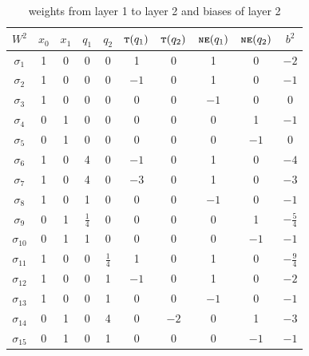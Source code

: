 \documentclass{beamer}
\newcommand{\shortTos}{\textsc{\texttt{t}}}
\newcommand{\shortNonempty}{\textsc{\texttt{ne}}}
\begin{document}
\begin{frame}
	\footnotesize
	\begin{table}
		\centering
		\begin{tabular}{|c| c c c c c c c c |c|}
			\hline 
			$W^2$ & $x_0$ & $x_1$ & $q_1$ & $q_2$ & $\shortTos(q_1)$ & $\shortTos(q_2)$ & $\shortNonempty(q_1)$ & $\shortNonempty(q_2)$ & $b^2$\\
			\hline
			$\sigma_1$ & 1 & 0 & 0 & 0 & 1 & 0 & 1 & 0 & $-2$\\
			$\sigma_2$ & 1 & 0 & 0 & 0 & $-1$ & 0 & 1 & 0 & $-1$\\
			$\sigma_3$ & 1 & 0 & 0 & 0 & 0 & 0 & $-1$ & 0 & 0\\
			$\sigma_4$ & 0 & 1 & 0 & 0 & 0 & 0 & 0 & 1 & $-1$\\
			$\sigma_5$ & 0 & 1 & 0 & 0 & 0 & 0 & 0 & $-1$ & 0\\
			$\sigma_6$ & 1 & 0 & 4 & 0 & $-1$ & 0 & 1 & 0 & $-4$\\
			$\sigma_7$ & 1 & 0 & 4 & 0 & $-3$ & 0 & 1 & 0 & $-3$\\
			$\sigma_8$ & 1 & 0 & 1 & 0 & 0 & 0 & $-1$ & 0 & $-1$\\
			$\sigma_9$ & 0 & 1 & $\frac{1}{4}$ & 0 & 0 & 0 & 0 & 1 & $-\frac{5}{4}$\\
			$\sigma_{10}$ & 0 & 1 & 1 & 0 & 0 & 0 & 0 & $-1$ & $-1$\\
			$\sigma_{11}$ & 1 & 0 & 0 & $\frac{1}{4}$ & 1 & 0 & 1 & 0 & $-\frac{9}{4}$\\
			$\sigma_{12}$ & 1 & 0 & 0 & 1 & $-1$ & 0 & 1 & 0 & $-2$\\
			$\sigma_{13}$ & 1 & 0 & 0 & 1 & 0 & 0 & $-1$ & 0 & $-1$\\
			$\sigma_{14}$ & 0 & 1 & 0 & 4 & 0 & $-2$ & 0 & 1 & $-3$\\
			$\sigma_{15}$ & 0 & 1 & 0 & 1 & 0 & 0 & 0 & $-1$ & $-1$\\
			\hline
		\end{tabular}
		\caption{weights from layer 1 to layer 2 and biases of layer 2}
	\end{table}
\end{frame}
\end{document}

